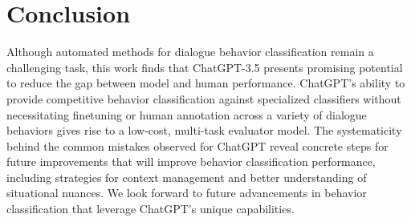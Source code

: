 \section{Conclusion}
\label{sec:conclusion}

Although automated methods for dialogue behavior classification remain a challenging task, this work finds that ChatGPT-3.5 presents promising potential to reduce the gap between model and human performance. ChatGPT's ability to provide competitive behavior classification against specialized classifiers without necessitating finetuning or human annotation across a variety of dialogue behaviors gives rise to a low-cost, multi-task evaluator model. The systematicity behind the common mistakes observed for ChatGPT reveal concrete steps for future improvements that will improve behavior classification performance, including strategies for context management and better understanding of situational nuances. We look forward to future advancements in behavior classification that leverage ChatGPT's unique capabilities.


